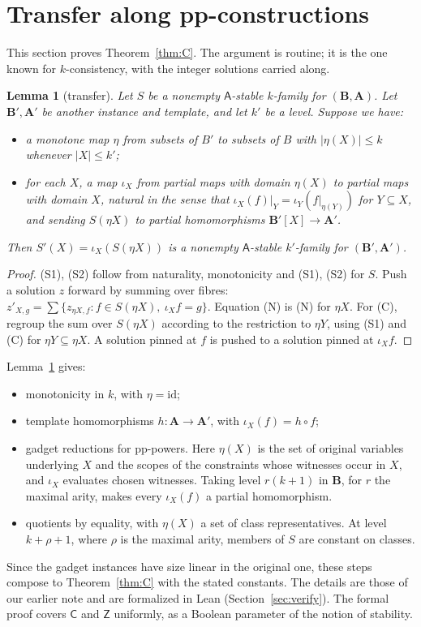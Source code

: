 \documentclass[11pt]{article}
\newtheorem{lemma}[theorem]{Lemma}
\theoremstyle{definition}
\theoremstyle{remark}
\newcommand{\Coh}{\mathsf{C}}
\newcommand{\Aff}{\mathsf{Z}}
\begin{document}
\section{Transfer along pp-constructions}\label{sec:transfer}

This section proves Theorem~\ref{thm:C}. The argument is routine; it is the one
known for $k$-consistency, with the integer solutions carried along.

\begin{lemma}[transfer]\label{lem:transfer}
Let $S$ be a nonempty $\mathsf A$-stable $k$-family for $(\mathbf B,\mathbf A)$.
Let $\mathbf B',\mathbf A'$ be another instance and template, and let $k'$ be a
level. Suppose we have:
\begin{itemize}
\item a monotone map $\eta$ from subsets of $B'$ to subsets of $B$ with
$|\eta(X)|\le k$ whenever $|X|\le k'$;
\item for each $X$, a map $\iota_X$ from partial maps with domain $\eta(X)$ to
partial maps with domain $X$, natural in the sense that
$\iota_X(f)|_Y=\iota_Y(f|_{\eta(Y)})$ for $Y\subseteq X$, and sending
$S(\eta X)$ to partial homomorphisms $\mathbf B'[X]\to\mathbf A'$.
\end{itemize}
Then $S'(X)=\iota_X(S(\eta X))$ is a nonempty $\mathsf A$-stable
$k'$-family for $(\mathbf B',\mathbf A')$.
\end{lemma}
\begin{proof}
(S1), (S2) follow from naturality, monotonicity and (S1), (S2) for $S$. Push a
solution $z$ forward by summing over fibres:
$z'_{X,g}=\sum\{z_{\eta X,f} : f\in S(\eta X),\ \iota_X f=g\}$. Equation (N)
is (N) for $\eta X$. For (C), regroup the sum over $S(\eta X)$ according to the
restriction to $\eta Y$, using (S1) and (C) for $\eta Y\subseteq\eta X$. A
solution pinned at $f$ is pushed to a solution pinned at $\iota_X f$.
\end{proof}

Lemma~\ref{lem:transfer} gives:
\begin{itemize}
\item monotonicity in $k$, with $\eta=\mathrm{id}$;
\item template homomorphisms $h\colon\mathbf A\to\mathbf A'$, with
$\iota_X(f)=h\circ f$;
\item gadget reductions for pp-powers. Here $\eta(X)$ is the set of original
variables underlying $X$ and the scopes of the constraints whose witnesses occur
in $X$, and $\iota_X$ evaluates chosen witnesses. Taking level $r(k+1)$ in
$\mathbf B$, for $r$ the maximal arity, makes every $\iota_X(f)$ a partial
homomorphism.
\item quotients by equality, with $\eta(X)$ a set of class representatives.
At level $k+\rho+1$, where $\rho$ is the maximal arity, members of $S$ are
constant on classes.
\end{itemize}
Since the gadget instances have size linear in the original one, these steps
compose to Theorem~\ref{thm:C} with the stated constants. The details are those
of our earlier note and are formalized in Lean (Section~\ref{sec:verify}). The
formal proof covers $\Coh$ and $\Aff$ uniformly, as a Boolean parameter of the
notion of stability.
\end{document}
